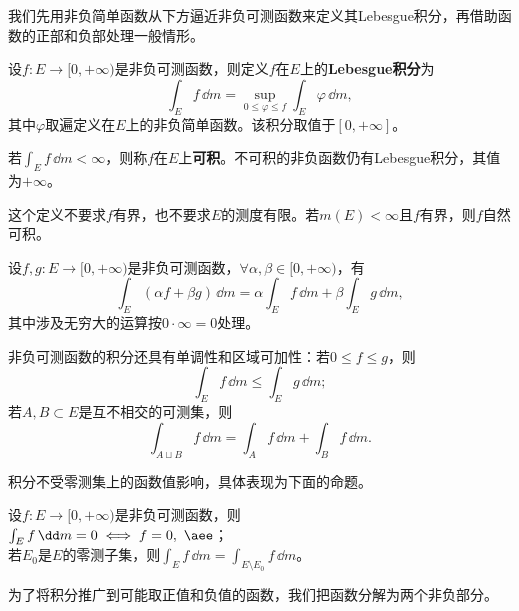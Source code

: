 我们先用非负简单函数从下方逼近非负可测函数来定义其Lebesgue积分，再借助函数的正部和负部处理一般情形。

\begin{definition}[非负可测函数的Lebesgue积分]
    设$f:E\to[0,+\infty)$是非负可测函数，则定义$f$在$E$上的\textbf{Lebesgue积分}为
    \begin{equation}
        \int_{E}f\,\dd m=\sup_{0\leq \varphi\leq f}\int_{E}\varphi\,\dd m,
    \end{equation}
    其中$\varphi$取遍定义在$E$上的非负简单函数。该积分取值于$[0,+\infty]$。

    若$\int_{E}f\,\dd m<\infty$，则称$f$在$E$上\textbf{可积}。不可积的非负函数仍有Lebesgue积分，其值为$+\infty$。
\end{definition}

这个定义不要求$f$有界，也不要求$E$的测度有限。若$m(E)<\infty$且$f$有界，则$f$自然可积。

\begin{theorem}[非负可测函数的Lebesgue积分的线性性]
    设$f,g:E\to[0,+\infty)$是非负可测函数，$\forall\alpha,\beta\in[0,+\infty)$，有
    \begin{equation}
        \int_{E}(\alpha f+\beta g)\,\dd m=\alpha\int_{E}f\,\dd m+\beta\int_{E}g\,\dd m,
    \end{equation}
    其中涉及无穷大的运算按$0\cdot\infty=0$处理。
\end{theorem}

非负可测函数的积分还具有单调性和区域可加性：若$0\leq f\leq g$，则
\begin{equation}
    \int_E f\,\dd m\leq\int_E g\,\dd m;
\end{equation}
若$A,B\subset E$是互不相交的可测集，则
\begin{equation}
    \int_{A\sqcup B}f\,\dd m=\int_A f\,\dd m+\int_B f\,\dd m.
\end{equation}

积分不受零测集上的函数值影响，具体表现为下面的命题。

\begin{proposition}
    设$f:E\to[0,+\infty)$是非负可测函数，则\\
     $\int_{E}f\,\dd m=0\iff f=0,\ \aee$；\\
     若$E_0$是$E$的零测子集，则$\int_{E}f\,\dd m=\int_{E\setminus E_0}f\,\dd m$。
\end{proposition}

为了将积分推广到可能取正值和负值的函数，我们把函数分解为两个非负部分。

